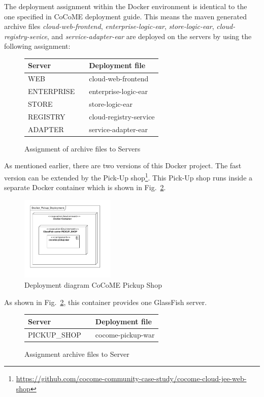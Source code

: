  	\noindent
 	The deployment assignment within the Docker environment is identical to the one specified in CoCoME deployment guide.
 	This means the maven generated archive files \textit{cloud-web-frontend}, \textit{enterprise-logic-ear}, \textit{store-logic-ear}, \textit{cloud-registry-sevice}, and \textit{service-adapter-ear} are deployed on the servers by using the following assignment:
 	\begin{figure}[H]
 		\centering
 		\begin{tabular}{l| l l}%
 			Server && Deployment file \\
 			\hline
 			WEB && cloud-web-frontend  \\
 			ENTERPRISE && enterprise-logic-ear  \\
 			STORE && store-logic-ear  \\
 			REGISTRY && cloud-registry-service  \\
 			ADAPTER && service-adapter-ear \\	
 		\end{tabular}
 		\caption{Assignment of archive files to Servers}
 		\label{table_assignment}
 	\end{figure}
 \noindent
    As mentioned earlier, there are two versions of this Docker project.
 	 The fast version can be extended by the Pick-Up shop\footnote{\url{https://github.com/cocome-community-case-study/cocome-cloud-jee-web-shop}}. This Pick-Up shop runs inside a separate Docker container which is shown in Fig.~\ref{Deploym_Pickup}.  
 	\begin{figure}[h]
 		\centering
 		\includegraphics[width = 0.4\textwidth]{img/docker_Container_PickUP.pdf}
 		\caption{Deployment diagram CoCoME Pickup Shop}
 		\label{Deploym_Pickup}
 	\end{figure}
 	As shown in Fig.~\ref{Deploym_Pickup}, this container provides one GlassFish server.
 	\begin{figure}[H]
 		\centering
 		\begin{tabular}{l|l l}%
 			Server && Deployment file \\
 			\hline
 			PICKUP\_SHOP && cocome-pickup-war \\	
 		\end{tabular}
 		\caption{Assignment archive files to Server}
 		\label{table_assignment_pickup}
 	\end{figure}
